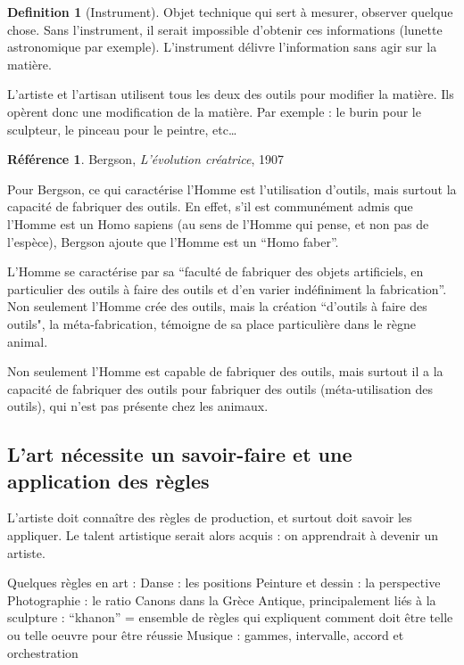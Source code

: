 \documentclass[french]{book}
\theoremstyle{definition}
\newtheorem*{dfn}{Definition}
\newtheorem*{refe}{Référence}
\begin{document}
\begin{dfn}[Instrument]
	Objet technique qui sert à mesurer, observer quelque chose. Sans l’instrument, il serait impossible d’obtenir ces informations (lunette astronomique par exemple). L’instrument délivre l'information sans agir sur la matière.
\end{dfn}


L’artiste et l'artisan utilisent tous les deux des outils pour modifier la matière. Ils opèrent donc une modification de la matière. Par exemple : le burin pour le sculpteur, le pinceau pour le peintre, etc…

\begin{refe}
	Bergson, \textit{L’évolution créatrice}, 1907
\end{refe}

Pour Bergson, ce qui caractérise l’Homme est l’utilisation d’outils, mais surtout la capacité de fabriquer des outils. En effet, s’il est communément admis que l’Homme est un Homo sapiens (au sens de l’Homme qui pense, et non pas de l’espèce), Bergson ajoute que l’Homme est un “Homo faber”.

L’Homme se caractérise par sa “faculté de fabriquer des objets artificiels, en particulier des outils à faire des outils et d’en varier indéfiniment la fabrication”. Non seulement l’Homme crée des outils, mais la création “d’outils à faire des outils", la méta-fabrication, témoigne de sa place particulière dans le règne animal.

Non seulement l’Homme est capable de fabriquer des outils, mais surtout il a la capacité de fabriquer des outils pour fabriquer des outils (méta-utilisation des outils), qui n’est pas présente chez les animaux.

\subsection{L’art nécessite un savoir-faire et une application des règles}

L’artiste doit connaître des règles de production, et surtout doit savoir les appliquer.
Le talent artistique serait alors acquis : on apprendrait à devenir un artiste.

Quelques règles en art :
Danse : les positions
Peinture et dessin : la perspective
Photographie : le ratio
Canons dans la Grèce Antique, principalement liés à la sculpture :
“khanon” = ensemble de règles qui expliquent comment doit être telle ou telle oeuvre pour être réussie
Musique : gammes, intervalle, accord et orchestration
\end{document}
